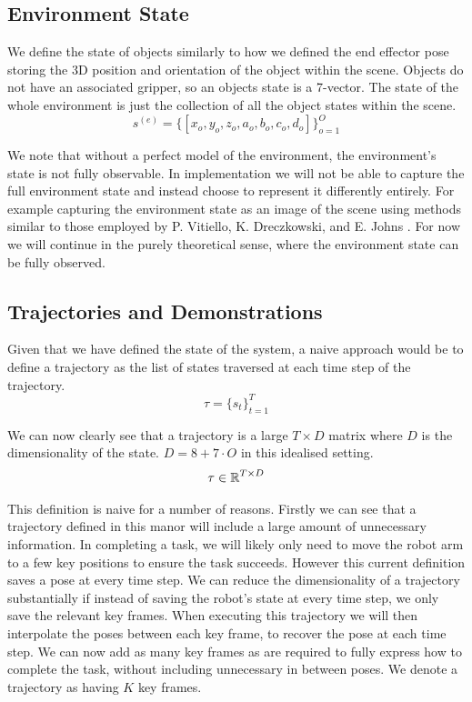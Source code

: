 \subsection{Environment State}
We define the state of objects similarly to how we defined the end effector pose storing the 3D position and orientation of the object within the scene. Objects do not have an associated gripper, so an objects state is a 7-vector. The state of the whole environment is just the collection of all the object states within the scene.
$$s^{(e)} = \{[x_o, y_o, z_o, a_o, b_o, c_o, d_o]\}_{o=1}^O$$

We note that without a perfect model of the environment, the environment's state is not fully observable. In implementation we will not be able to capture the full environment state and instead choose to represent it differently entirely. For example capturing the environment state as an image of the scene using methods similar to those employed by P. Vitiello, K. Dreczkowski, and E. Johns \cite{one-shot-pose-estimate}. For now we will continue in the purely theoretical sense, where the environment state can be fully observed.

\subsection{Trajectories and Demonstrations}
Given that we have defined the state of the system, a naive approach would be to define a trajectory as the list of states traversed at each time step of the trajectory.
$$\tau = \{s_t\}_{t=1}^T$$

We can now clearly see that a trajectory is a large $T \times D$ matrix where $D$ is the dimensionality of the state. $D = 8 + 7 \cdot O$ in this idealised setting.
$$\tau \in \operatorname{\mathbb{R}}^{T \times D}$$

This definition is naive for a number of reasons. Firstly we can see that a trajectory defined in this manor will include a large amount of unnecessary information. In completing a task, we will likely only need to move the robot arm to a few key positions to ensure the task succeeds. However this current definition saves a pose at every time step. We can reduce the dimensionality of a trajectory substantially if instead of saving the robot's state at every time step, we only save the relevant key frames. When executing this trajectory we will then interpolate the poses between each key frame, to recover the pose at each time step. We can now add as many key frames as are required to fully express how to complete the task, without including unnecessary in between poses. We denote a trajectory as having $K$ key frames.\\

